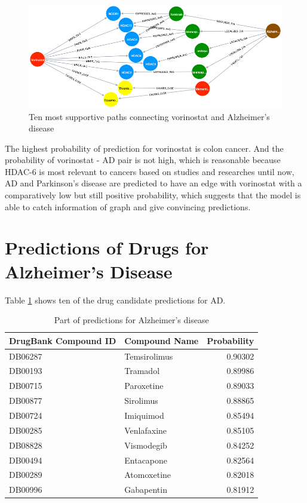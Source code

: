 \begin{figure}[!h]
    \centering
    \includegraphics[scale=0.5]
    {figures/vorinastat.png}
    \captionsetup{justification=centering}
    \caption{\label{fig:vorinastat} Ten most supportive paths connecting vorinostat and Alzheimer’s disease
}
\end{figure}

The highest probability of prediction for vorinostat is colon cancer. And the probability of vorinostat - AD pair is not high, which is reasonable because HDAC-6 is most relevant to cancers based on studies and researches until now, AD and Parkinson’s disease are predicted to have an edge with vorinostat with a comparatively low but still positive probability, which suggests that the model is able to catch information of graph and give convincing predictions.

\section{Predictions of Drugs for Alzheimer’s Disease}

Table \ref{tab:alzheimer} shows ten of the drug candidate predictions for AD. 

\begin{table}[!ht]
    \centering
    \begin{tabular}{|p{6cm}|l|r|}
        \hline
        \textbf{DrugBank Compound ID} & \textbf{Compound Name} & \textbf{Probability}\\
        \hline
        DB06287 & Temsirolimus & 0.90302 \\
        \hline
        DB00193& Tramadol & 0.89986 \\
        \hline
        DB00715 & Paroxetine & 0.89033 \\
        \hline
        DB00877 & Sirolimus & 0.88865 \\
        \hline
        DB00724 & Imiquimod & 0.85494 \\
        \hline
        DB00285 & Venlafaxine & 0.85105 \\
        \hline
        DB08828 & Vismodegib & 0.84252 \\
        \hline
        DB00494 & Entacapone & 0.82564 \\
        \hline
        DB00289 & Atomoxetine & 0.82018 \\
        \hline
        DB00996 & Gabapentin & 0.81912 \\
        \hline
    \end{tabular}
    \captionsetup{justification=centering}
    \caption{Part of predictions for Alzheimer’s disease}
    \label{tab:alzheimer}
\end{table}

